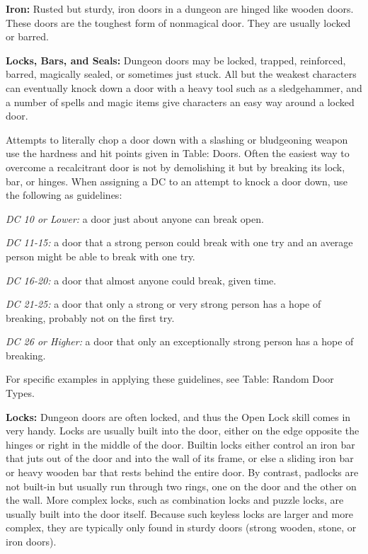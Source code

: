 \textbf{Iron:} Rusted but sturdy, iron doors in a dungeon are hinged like wooden 
doors. These doors are the toughest form of nonmagical door. They are usually locked 
or barred.

\textbf{Locks, Bars, and Seals:} Dungeon doors may be locked, trapped, reinforced, 
barred, magically sealed, or sometimes just stuck. All but the weakest characters 
can eventually knock down a door with a heavy tool such as a sledgehammer, and 
a number of spells and magic items give characters an easy way around a locked 
door.

Attempts to literally chop a door down with a slashing or bludgeoning weapon use 
the hardness and hit points given in Table: Doors. Often the easiest way to overcome 
a recalcitrant door is not by demolishing it but by breaking its lock, bar, or 
hinges. When assigning a DC to an attempt to knock a door down, use the following 
as guidelines:

\textit{DC 10 or Lower:} a door just about anyone can break open.

\textit{DC 11-15:} a door that a strong person could break with one try and an 
average person might be able to break with one try. 

\textit{DC 16-20:} a door that almost anyone could break, given time.

\textit{DC 21-25:} a door that only a strong or very strong person has a hope of 
breaking, probably not on the first try.

\textit{DC 26 or Higher:} a door that only an exceptionally strong person has a 
hope of breaking.

For specific examples in applying these guidelines, see Table: Random Door Types. 

\textbf{Locks:} Dungeon doors are often locked, and thus the Open Lock skill comes 
in very handy. Locks are usually built into the door, either on the edge opposite 
the hinges or right in the middle of the door. Builtin locks either control an 
iron bar that juts out of the door and into the wall of its frame, or else a sliding 
iron bar or heavy wooden bar that rests behind the entire door. By contrast, padlocks 
are not built-in but usually run through two rings, one on the door and the other 
on the wall. More complex locks, such as combination locks and puzzle locks, are 
usually built into the door itself. Because such keyless locks are larger and more 
complex, they are typically only found in sturdy doors (strong wooden, stone, or 
iron doors).

